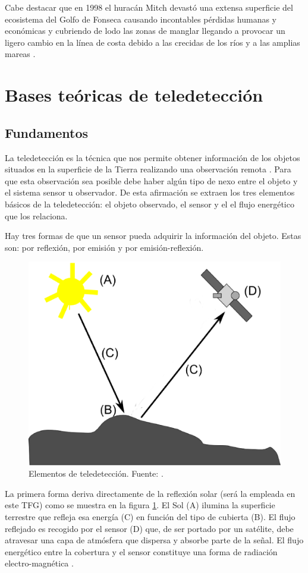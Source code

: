 Cabe destacar que en 1998 el huracán Mitch devastó una extensa superficie del ecosistema del Golfo de Fonseca causando incontables pérdidas humanas y económicas y cubriendo de lodo las zonas de manglar llegando a provocar un ligero cambio en la línea de costa debido a las crecidas de los ríos y a las amplias mareas \citep{mexico1999honduras}.

\section{Bases teóricas de teledetección} \label{sec:bases}
\subsection{Fundamentos} \label{subsec:fundamentos}
La teledetección es la técnica que nos permite obtener información de los objetos situados en la superficie de la Tierra realizando una observación remota \citep{Curran1991Longman} \citep{chuvieco2002teledeteccion} \citep{schowengerdt2006}. Para que esta observación sea posible debe haber algún tipo de nexo entre el objeto y el sistema sensor u observador. De esta afirmación se extraen los tres elementos básicos de la teledetección: el objeto observado, el sensor y el el flujo energético que los relaciona.%

Hay tres formas de que un sensor pueda adquirir la información del objeto. Estas son: por reflexión, por emisión y por emisión-reflexión.%

\begin{figure}
	\centering
	\includegraphics[width=0.4\linewidth]{./Imagenes/Elementos_teledeteccion_modificado.eps}
	\caption[Elementos de teledetección]{Elementos de teledetección. Fuente: \cite{Olaya2010}.}
	\label{fig:elementos}
\end{figure}

La primera forma deriva directamente de la reflexión solar (será la empleada en este \ac{TFG}) como se muestra en la figura \ref{fig:elementos}. El Sol (A) ilumina la superficie terrestre que refleja esa energía (C) en función del tipo de cubierta (B). El flujo reflejado es recogido por el sensor (D) que, de ser portado por un satélite, debe atravesar una capa de atmósfera que dispersa y absorbe parte de la señal. El flujo energético entre la cobertura y el sensor constituye una forma de radiación electro-magnética \citep{Olaya2010}.%

